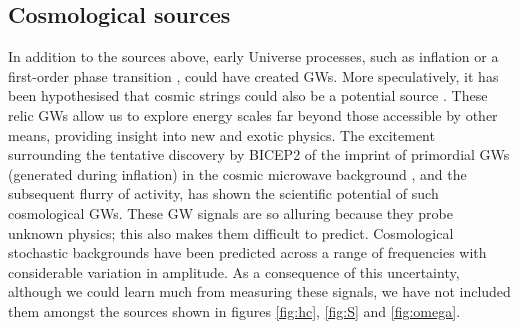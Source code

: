 \subsection{Cosmological sources}

In addition to the sources above, early Universe processes, such as inflation \citep{Grishchuk2005} or a first-order phase transition \citep{Binetruy2012}, could have created GWs. More speculatively, it has been hypothesised that cosmic strings could also be a potential source \citep{Damour2005,Binetruy2012}. These relic GWs allow us to explore energy scales far beyond those accessible by other means, providing insight into new and exotic physics. The excitement surrounding the tentative discovery by BICEP2 of the imprint of primordial GWs (generated during inflation) in the cosmic microwave background \citep{Ade2014}, and the subsequent flurry of activity, has shown the scientific potential of such cosmological GWs. These GW signals are so alluring because they probe unknown physics; this also makes them difficult to predict. Cosmological stochastic backgrounds have been predicted across a range of frequencies with considerable variation in amplitude. As a consequence of this uncertainty, although we could learn much from measuring these signals, we have not included them amongst the sources shown in figures \ref{fig:hc}, \ref{fig:S} and \ref{fig:omega}.


